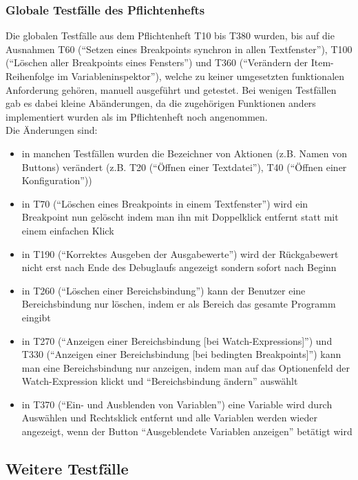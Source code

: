 \documentclass[parskip=full]{scrartcl}
\begin{document}
\subsubsection{Globale Testfälle des Pflichtenhefts} %
Die globalen Testfälle aus dem Pflichtenheft T10 bis T380 wurden, bis auf die Ausnahmen T60 (\enquote{Setzen eines Breakpoints synchron in allen Textfenster}), T100 (\enquote{Löschen aller Breakpoints eines Fensters}) und T360 (\enquote{Verändern der Item-Reihenfolge im Variableninspektor}), welche zu keiner umgesetzten funktionalen Anforderung gehören, manuell ausgeführt und getestet. Bei wenigen Testfällen gab es dabei kleine Abänderungen, da die zugehörigen Funktionen anders implementiert wurden als im Pflichtenheft noch angenommen. \\
Die Änderungen sind: \\
\begin{itemize}
	\item in manchen Testfällen wurden die Bezeichner von Aktionen (z.B. Namen von Buttons) verändert (z.B. T20 (\enquote{Öffnen einer Textdatei}), T40 (\enquote{Öffnen einer Konfiguration}))
	\item in T70 (\enquote{Löschen eines Breakpoints in einem Textfenster}) wird ein Breakpoint nun gelöscht indem man ihn mit Doppelklick entfernt statt mit einem einfachen Klick
	\item  in T190 (\enquote{Korrektes Ausgeben der Ausgabewerte}) wird der Rückgabewert nicht erst nach Ende des Debuglaufs angezeigt sondern sofort nach Beginn
	\item in T260 (\enquote{Löschen einer Bereichsbindung}) kann der Benutzer eine Bereichsbindung nur löschen, indem er als Bereich das gesamte Programm eingibt
	\item in T270 (\enquote{Anzeigen einer Bereichsbindung [bei Watch-Expressions]}) und T330 (\enquote{Anzeigen einer Bereichsbindung [bei bedingten Breakpoints]}) kann man eine Bereichsbindung nur anzeigen, indem man auf das Optionenfeld der Watch-Expression klickt und \enquote{Bereichsbindung ändern} auswählt
	\item in T370 (\enquote{Ein- und Ausblenden von Variablen}) eine Variable wird durch Auswählen und Rechtsklick entfernt und alle Variablen werden wieder angezeigt, wenn der Button \enquote{Ausgeblendete Variablen anzeigen} betätigt wird
\end{itemize}

\subsection{Weitere Testfälle}
\end{document}
